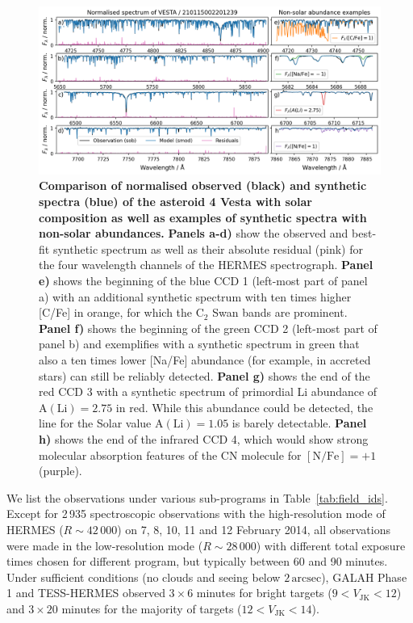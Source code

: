 \documentclass[
  journal=pasa,
  manuscript=research-paper, %
  year=2024,
  volume=37
]{cup-journal}
\begin{document}
\begin{figure}[ht]
 \centering
 \includegraphics[width=\textwidth]{figures/210115002201239_abundance_examples.png}
 \caption{\textbf{Comparison of normalised observed (black) and synthetic spectra (blue) of the asteroid 4 Vesta with solar composition as well as examples of synthetic spectra with non-solar abundances.}
 \textbf{Panels a-d)} show the observed and best-fit synthetic spectrum as well as their absolute residual (pink) for the four wavelength channels of the HERMES spectrograph.
 \textbf{Panel e)} shows the beginning of the blue CCD 1 (left-most part of panel a) with an additional synthetic spectrum with ten times higher [C/Fe] in orange, for which the $\mathrm{C}_2$  Swan bands are prominent.
 \textbf{Panel f)} shows the beginning of the green CCD 2 (left-most part of panel b) and exemplifies with a synthetic spectrum in green that also a ten times lower [Na/Fe] abundance (for example, in accreted stars) can still be reliably detected. 
 \textbf{Panel g)} shows the end of the red CCD 3 with a synthetic spectrum of primordial Li abundance of $\mathrm{A(Li)} = 2.75$ in red. While this abundance could be detected, the line for the Solar value $\mathrm{A(Li)} = 1.05$ is barely detectable.
 \textbf{Panel h)} shows the end of the infrared CCD 4, which would show strong molecular absorption features of the CN molecule for $\mathrm{[N/Fe]} = +1$ (purple).
 }
 \label{fig:210115002201239_abundance_examples}
\end{figure}

We list the observations under various sub-programs in Table~\ref{tab:field_ids}. Except for 2\,935 spectroscopic observations with the high-resolution mode of HERMES ($R \sim 42\,000$) on 7, 8, 10, 11 and 12 February 2014, all observations were made in the low-resolution mode ($R \sim 28\,000$) with different total exposure times chosen for different program, but typically between 60 and 90 minutes. Under sufficient conditions (no clouds and seeing below $2\,\mathrm{arcsec}$), GALAH Phase 1 and TESS-HERMES observed $3 \times 6$ minutes for bright targets ($9 < V_\mathrm{JK} < 12$) and $3 \times 20$ minutes for the majority of targets ($12 < V_\mathrm{JK} < 14$).
\end{document}
